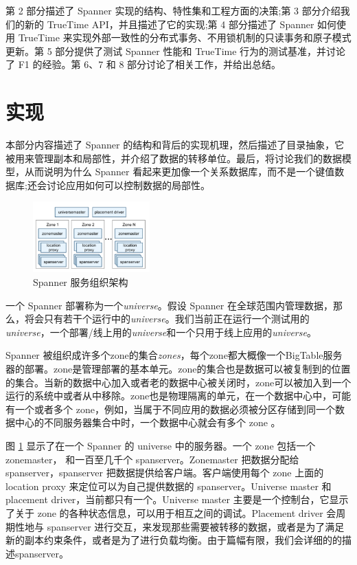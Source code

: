 \documentclass[letterpaper,twocolumn,10pt]{article}
\begin{document}
第 2 部分描述了 Spanner 实现的结构、特性集和工程方面的决策;第 3 部分介绍我们的新的 TrueTime API，并且描述了它的实现;第 4 部分描述了 Spanner 如何使用 TrueTime 来实现外部一致性的分布式事务、不用锁机制的只读事务和原子模式更新。第 5 部分提供了测试 Spanner 性能和 TrueTime 行为的测试基准，并讨论了 F1 的经验。第 6、7 和 8 部分讨论了相关工作，并给出总结。

\section{实现}
本部分内容描述了 Spanner 的结构和背后的实现机理，然后描述了目录抽象，它被用来管理副本和局部性，并介绍了数据的转移单位。最后，将讨论我们的数据模型，从而说明为什么 Spanner 看起来更加像一个关系数据库，而不是一个键值数据库;还会讨论应用如何可以控制数据的局部性。

\begin{figure}[htbp]
\begin{center}
\includegraphics[width=0.4\textwidth]{./fig_1.png}
\caption{Spanner 服务组织架构}
\label{Fig1}
\end{center}
\end{figure}

一个 Spanner 部署称为一个\textit{universe}。假设 Spanner 在全球范围内管理数据，那么，将会只有若干个运行中的\textit{universe}。我们当前正在运行一个测试用的\textit{universe}，一个部署/线上用的\textit{universe}和一个只用于线上应用的\textit{universe}。

Spanner 被组织成许多个zone的集合\textit{zones}，每个zone都大概像一个BigTable服务器的部署。zone是管理部署的基本单元。zone的集合也是数据可以被复制到的位置的集合。当新的数据中心加入或者老的数据中心被关闭时，zone可以被加入到一个运行的系统中或者从中移除。zone也是物理隔离的单元，在一个数据中心中，可能有一个或者多个 zone，例如，当属于不同应用的数据必须被分区存储到同一个数据中心的不同服务器集合中时，一个数据中心就会有多个 zone 。

图 \ref{Fig1} 显示了在一个 Spanner 的 universe 中的服务器。一个 zone 包括一个 zonemaster， 和一百至几千个 spanserver。Zonemaster 把数据分配给 spanserver，spanserver 把数据提供给客户端。客户端使用每个 zone 上面的 location proxy 来定位可以为自己提供数据的 spanserver。Universe master 和 placement driver，当前都只有一个。Universe master 主要是一个控制台，它显示了关于 zone 的各种状态信息，可以用于相互之间的调试。Placement driver 会周期性地与 spanserver 进行交互，来发现那些需要被转移的数据，或者是为了满足新的副本约束条件，或者是为了进行负载均衡。由于篇幅有限，我们会详细的的描述spanserver。
\end{document}
